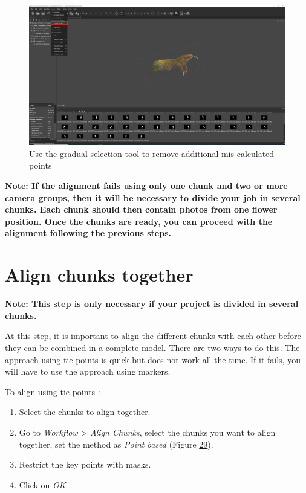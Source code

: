 \documentclass[
]{book}
\theoremstyle{definition}
\theoremstyle{definition}
\theoremstyle{definition}
\theoremstyle{definition}
\theoremstyle{remark}
\begin{document}
\begin{figure}
\hypertarget{model_orientation2}{%
\centering
\includegraphics[width=1\textwidth,height=\textheight]{Figures/metashape_gradual_selection.png}
\caption{Use the gradual selection tool to remove additional mis-calculated
points}\label{model_orientation2}
}
\end{figure}

\textbf{Note: If the alignment fails using only one chunk and two or more
camera groups, then it will be necessary to divide your job in several
chunks. Each chunk should then contain photos from one flower position.
Once the chunks are ready, you can proceed with the alignment following
the previous steps.}

\hypertarget{align-chunks-together}{%
\section{Align chunks together}\label{align-chunks-together}}

\textbf{Note: This step is only necessary if your project is divided in
several chunks.}

At this step, it is important to align the different chunks with each
other before they can be combined in a complete model. There are two
ways to do this. The approach using tie points is quick but does not
work all the time. If it fails, you will have to use the approach using
markers.

To align using tie points :

\begin{enumerate}
\def\labelenumi{\arabic{enumi}.}
\item
  Select the chunks to align together.
\item
  Go to \emph{Workflow} \textgreater{} \emph{Align Chunks}, select the chunks you want to
  align together, set the method as \emph{Point based} (Figure
  \protect\hyperlink{Align_chunk}{29}).
\item
  Restrict the key points with masks.
\item
  Click on \emph{OK}.
\end{enumerate}
\end{document}
